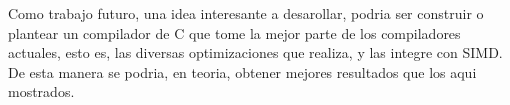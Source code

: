 \documentclass[a4paper]{article}
\begin{document}
Como trabajo futuro, una idea interesante a desarollar, podria ser construir o plantear un compilador de C que tome la mejor parte de los compiladores actuales, esto es, las diversas optimizaciones que
realiza, y las integre con SIMD. De esta manera se podria, en teoria, obtener mejores resultados que los aqui mostrados.
\end{document}
